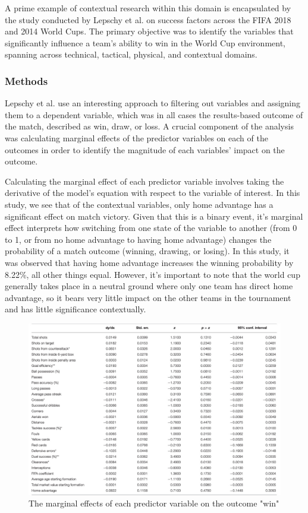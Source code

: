 A prime example of contextual research within this domain is encapsulated by the study conducted by Lepschy et al. \cite{Lepschy2021} on success factors across the FIFA 2018 and 2014 World Cups. The primary objective was to identify the variables that significantly influence a team's ability to win in the World Cup environment, spanning across technical, tactical, physical, and contextual domains. 

\subsubsection{Methods}
Lepschy et al. use an interesting approach to filtering out variables and assigning them to a dependent variable, which was in all cases the results-based outcome of the match, described as win, draw, or loss. A crucial component of the analysis was calculating marginal effects of the predictor variables on each of the outcomes in order to identify the magnitude of each variables' impact on the outcome. 

Calculating the marginal effect of each predictor variable involves taking the derivative of the model's equation with respect to the variable of interest. In this study, we see that of the contextual variables, only home advantage has a significant effect on match victory. Given that this is a binary event, it's marginal effect interprets how switching from one state of the variable to another (from 0 to 1, or from no home advantage to having home advantage) changes the probability of a match outcome (winning, drawing, or losing). In this study, it was observed that having home advantage increases the winning probability by 8.22\%, all other things equal. However, it's important to note that the world cup generally takes place in a neutral ground where only one team has direct home advantage, so it bears very little impact on the other teams in the tournament and has little significance contextually. \newline

\begin{figure}
	\includegraphics[width=1.0\textwidth]{Figs/Marginal Effects.jpeg} 
	\caption[Marginal Effects for the outcome "win"]{The marginal effects of each predictor variable on the outcome "win" }
\label{figure3}
\end{figure}



